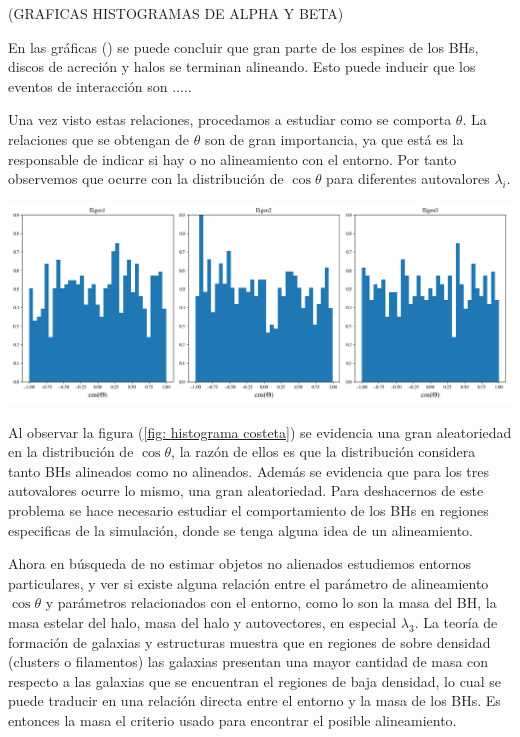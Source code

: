 (GRAFICAS HISTOGRAMAS DE ALPHA Y BETA)

En las gráficas () se puede concluir que gran parte de los espines de los BHs, discos de acreción y halos se terminan alineando. Esto puede inducir que los eventos de interacción son .....



Una vez visto estas relaciones, procedamos a estudiar como se comporta $\theta$. La relaciones que se obtengan de $\theta$ son de gran importancia, ya que está es la responsable de indicar si hay o no alineamiento con el entorno. Por tanto observemos que ocurre con la distribución de $\cos \theta$ para diferentes autovalores $\lambda_{i}$.
%
\begin{center}
\includegraphics[scale=.35]{./figures/6_Resultados/cosmo01/histograma_cos_theta.png}
\label{fig: histograma costeta}
\end{center}
%
Al observar la figura (\ref{fig: histograma costeta}) se evidencia una gran aleatoriedad en la distribución de $\cos\theta$, la razón de ellos es que la distribución considera tanto BHs alineados como no alineados. Además se evidencia que para los tres autovalores ocurre lo mismo, una gran aleatoriedad. Para deshacernos de este problema se hace necesario estudiar el comportamiento de los BHs en regiones especificas de la simulación, donde se tenga alguna idea de un alineamiento.  

Ahora en búsqueda de no estimar objetos no alienados estudiemos entornos particulares, y ver si existe alguna relación entre el parámetro de alineamiento $\cos\theta$ y parámetros relacionados con el entorno, como lo son la masa del BH, la masa estelar del halo, masa del halo y autovectores, en especial $\lambda_{3}$. La teoría de formación de galaxias y estructuras muestra que en regiones de sobre densidad (clusters o filamentos) las galaxias presentan una mayor cantidad de masa  con respecto a las galaxias que se encuentran el regiones de baja densidad, lo cual se puede traducir en una relación directa entre el entorno y la masa de los BHs. Es entonces la masa el criterio usado para encontrar el posible alineamiento. 

